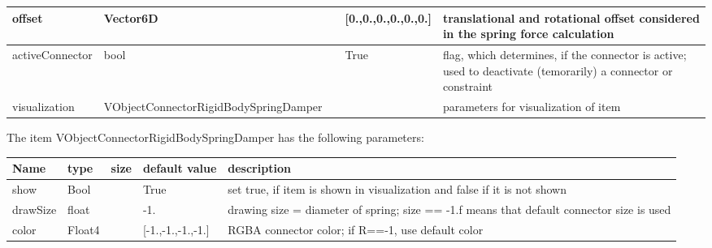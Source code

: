 \begin{center}
\begin{longtable}{| p{4.5cm} | p{2.5cm} | p{0.5cm} | p{2.5cm} | p{6cm} |}
    offset &     Vector6D &      &     [0.,0.,0.,0.,0.,0.] &     translational and rotational offset considered in the spring force calculation\\ \hline
    activeConnector &     bool &      &     True &     flag, which determines, if the connector is active; used to deactivate (temorarily) a connector or constraint\\ \hline
    visualization & VObjectConnectorRigidBodySpringDamper & & & parameters for visualization of item \\ \hline
	  \end{longtable}
	\end{center}
The item VObjectConnectorRigidBodySpringDamper has the following parameters:\vspace{-1cm}\\ 
\begin{center}
  \footnotesize
  \begin{longtable}{| p{4.5cm} | p{2.5cm} | p{0.5cm} | p{2.5cm} | p{6cm} |}
    \hline
    \bf Name & \bf type & \bf size & \bf default value & \bf description \\ \hline
    show &     Bool &      &     True &     set true, if item is shown in visualization and false if it is not shown\\ \hline
    drawSize &     float &      &     -1. &     drawing size = diameter of spring; size == -1.f means that default connector size is used\\ \hline
    color &     Float4 &      &     [-1.,-1.,-1.,-1.] &     RGBA connector color; if R==-1, use default color\\ \hline
	  \end{longtable}
	\end{center}

